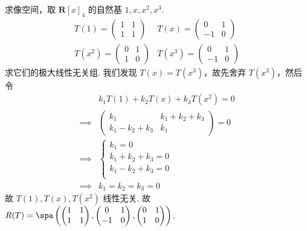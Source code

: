 \begin{exercise}
\begin{exgroup}
\begin{answer}
\begin{enumerate}
                      求像空间，取 $ \mathbf{R}[x]_4 $ 的自然基 $ 1, x, x^2, x^3 $.
                      \[ \begin{matrix}
                              T(1) = \begin{pmatrix} 1 & 1 \\ 1 & 1 \end{pmatrix}   & T(x) = \begin{pmatrix} 0 & 1 \\ -1 & 0 \end{pmatrix}   \\
                              T(x^2) = \begin{pmatrix} 0 & 1 \\ 1 & 0 \end{pmatrix} & T(x^3) = \begin{pmatrix} 0 & 1 \\ -1 & 0 \end{pmatrix}
                          \end{matrix} \]
                      求它们的极大线性无关组. 我们发现 $ T(x) = T(x^3) $，故先舍弃 $ T(x^3) $，然后令
                      \begin{align*}
                                     & k_1 T(1) + k_2 T(x) + k_3 T(x^2) = 0                                             \\
                          \implies{} & \begin{pmatrix} k_1 & k_1 + k_2 + k_3 \\ k_1 - k_2 + k_3 & k_1 \end{pmatrix} = 0 \\
                          \implies{} & \begin{cases}
                                           k_1 = 0             \\
                                           k_1 + k_2 + k_3 = 0 \\
                                           k_1 - k_2 + k_3 = 0 \\
                                       \end{cases}                                                              \\
                          \implies{} & k_1 = k_2 = k_3 = 0
                      \end{align*}
                      故 $ T(1), T(x), T(x^2) $ 线性无关. 故 $ R(T) = \spa\left(\begin{pmatrix} 1 & 1 \\ 1 & 1 \end{pmatrix}, \begin{pmatrix} 0 & 1 \\ -1 & 0 \end{pmatrix}, \begin{pmatrix} 0 & 1 \\ 1 & 0 \end{pmatrix}\right) $.


\end{enumerate}
\end{answer}
\end{exgroup}
\end{exercise}
